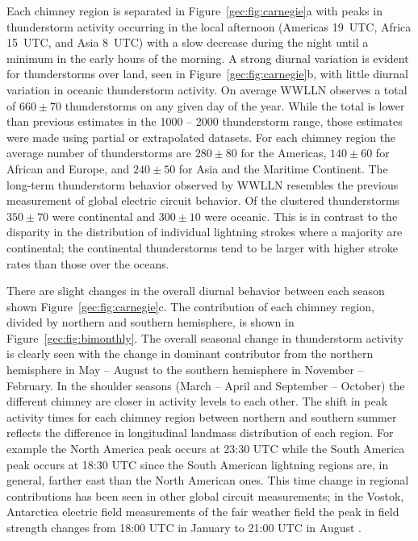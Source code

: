 Each chimney region is separated in Figure~\ref{gec:fig:carnegie}a with peaks in thunderstorm activity occurring in the local afternoon (Americas 19~UTC, Africa 15~UTC, and Asia 8~UTC) with a slow decrease during the night until a minimum in the early hours of the morning.
A strong diurnal variation is evident for thunderstorms over land, seen in Figure~\ref{gec:fig:carnegie}b, with  little diurnal variation in oceanic thunderstorm activity.
On average WWLLN observes a total of $660 \pm 70$ thunderstorms on any given day of the year.
While the total is lower than previous estimates in the 1000 -- 2000 thunderstorm range, those estimates were made using partial or extrapolated datasets.
For each chimney region the average number of thunderstorms are $280 \pm 80$ for the Americas, $140 \pm 60$ for African and Europe, and $240 \pm 50$ for Asia and the Maritime Continent.
The long-term thunderstorm behavior observed by WWLLN resembles the previous measurement of global electric circuit behavior.
Of the clustered thunderstorms $350 \pm 70$ were continental and $300 \pm 10$ were oceanic.
This is in contrast to the disparity in the distribution of individual lightning strokes where a majority are continental; the continental thunderstorms tend to be larger with higher stroke rates than those over the oceans.

There are slight changes in the overall diurnal behavior between each season shown Figure~\ref{gec:fig:carnegie}c.
The contribution of each chimney region, divided by northern and southern hemisphere, is shown in Figure~\ref{gec:fig:bimonthly}.
The overall seasonal change in thunderstorm activity is clearly seen with the change in dominant contributor from the northern hemisphere in May -- August to the southern hemisphere in November -- February.
In the shoulder seasons (March -- April and September -- October) the different chimney are closer in activity levels to each other.
The shift in peak activity times for each chimney region between northern and southern summer reflects the difference in longitudinal landmass distribution of each region.
For example the North America peak occurs at 23:30 UTC while the South America peak occurs at 18:30 UTC since the South American lightning regions are, in general, farther east than the North American ones.
This time change in regional contributions has been seen in other global circuit measurements; in the Vostok, Antarctica electric field measurements of the fair weather field the peak in field strength changes from 18:00 UTC in January to 21:00 UTC in August \citep{Burns2005, Burns2012}.

